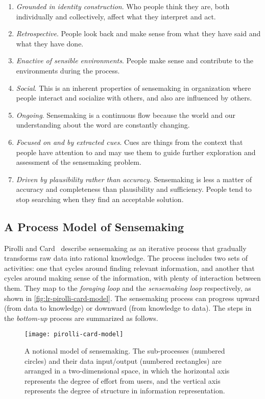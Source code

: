\begin{enumerate}
	\item \emph{Grounded in identity construction}. Who people think they are, both individually and collectively, affect what they interpret and act.
	\item \emph{Retrospective}. People look back and make sense from what they have said and what they have done.
	\item \emph{Enactive of sensible environments}. People make sense and contribute to the environments during the process.
	\item \emph{Social}. This is an inherent properties of sensemaking in organization where people interact and socialize with others, and also are influenced by others.
	\item \emph{Ongoing}. Sensemaking is a continuous flow because the world and our understanding about the word are constantly changing.
	\item \emph{Focused on and by extracted cues}. Cues are things from the context that people have attention to and may use them to guide further exploration and assessment of the sensemaking problem.
	\item \emph{Driven by plausibility rather than accuracy}. Sensemaking is less a matter of accuracy and completeness than plausibility and sufficiency. People tend to stop searching when they find an acceptable solution.
\end{enumerate}

\subsection{A Process Model of Sensemaking}
\label{sub:rv-pcm}
Pirolli and Card~\cite{Pirolli2005} describe sensemaking as an iterative process that gradually transforms raw data into rational knowledge. The process includes two sets of activities: one that cycles around finding relevant information, and another that cycles around making sense of the information, with plenty of interaction between them. They map to the \emph{foraging loop} and the \emph{sensemaking loop} respectively, as shown in \autoref{fig:lr-pirolli-card-model}. The sensemaking process can progress upward (from data to knowledge) or downward (from knowledge to data). The steps in the \emph{bottom-up} process are summarized as follows.

\begin{figure}[!htb]
	\centering
	\texttt{[image: pirolli-card-model]}
	\caption{A notional model of sensemaking. The sub-processes (numbered circles) and their data input/output (numbered rectangles) are arranged in a two-dimensional space, in which the horizontal axis represents the degree of effort from users, and the vertical axis represents the degree of structure in information representation. }
	\label{fig:lr-pirolli-card-model}
\end{figure}


